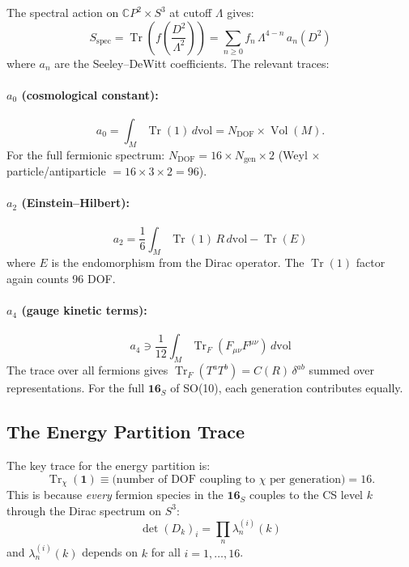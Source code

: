 \documentclass[11pt]{article}
\theoremstyle{definition}
\theoremstyle{remark}
\newcommand{\CP}{\mathbb{C}P}
\newcommand{\Tr}{\operatorname{Tr}}
\newcommand{\Vol}{\operatorname{Vol}}
\begin{document}
The spectral action on $\CP^2 \times S^3$ at cutoff $\Lambda$ gives:
\begin{equation}
  S_\mathrm{spec} = \Tr\!\left(f\!\left(\frac{D^2}{\Lambda^2}\right)\right)
  = \sum_{n \geq 0} f_n\,\Lambda^{4-n}\,a_n(D^2)
\end{equation}
where $a_n$ are the Seeley--DeWitt coefficients. The relevant traces:

\paragraph{$a_0$ (cosmological constant):}
\begin{equation}
  a_0 = \int_M \Tr(1)\,d\mathrm{vol}
  = N_\mathrm{DOF} \times \Vol(M).
\end{equation}
For the full fermionic spectrum: $N_\mathrm{DOF} = 16 \times N_\mathrm{gen} \times 2$
(Weyl $\times$ particle/antiparticle $= 16 \times 3 \times 2 = 96$).

\paragraph{$a_2$ (Einstein--Hilbert):}
\begin{equation}
  a_2 = \frac{1}{6}\int_M \Tr(1)\,R\,d\mathrm{vol} - \Tr(E)
\end{equation}
where $E$ is the endomorphism from the Dirac operator. The $\Tr(1)$ factor
again counts 96 DOF.

\paragraph{$a_4$ (gauge kinetic terms):}
\begin{equation}
  a_4 \ni \frac{1}{12}\int_M \Tr_F(F_{\mu\nu}F^{\mu\nu})\,d\mathrm{vol}
\end{equation}
The trace over all fermions gives $\Tr_F(T^a T^b) = C(R)\,\delta^{ab}$
summed over representations. For the full $\mathbf{16}_S$ of SO(10),
each generation contributes equally.

\subsection{The Energy Partition Trace}

The key trace for the energy partition is:
\begin{equation}
  \Tr_\chi(\mathbf{1}) \equiv
  \text{(number of DOF coupling to $\chi$ per generation)} = 16.
\end{equation}
This is because \emph{every} fermion species in the $\mathbf{16}_S$ couples
to the CS level $k$ through the Dirac spectrum on $S^3$:
\begin{equation}
  \det(D_k)_i = \prod_n \lambda_n^{(i)}(k)
\end{equation}
and $\lambda_n^{(i)}(k)$ depends on $k$ for all $i = 1, \ldots, 16$.
\end{document}
